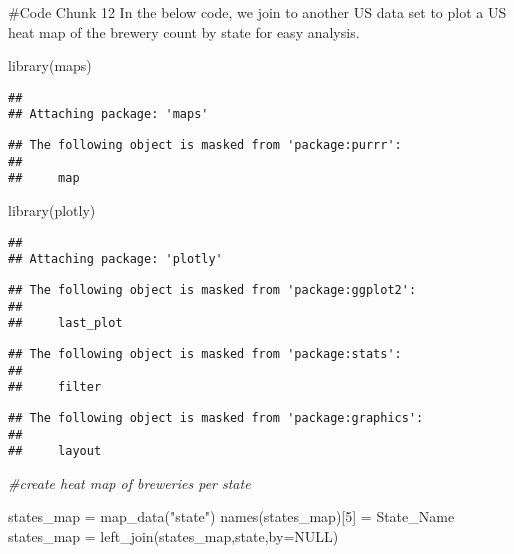 \documentclass[
]{article}
\newenvironment{Shaded}{\begin{snugshade}}{\end{snugshade}}
\newcommand{\AttributeTok}[1]{\textcolor[rgb]{0.77,0.63,0.00}{#1}}
\newcommand{\CommentTok}[1]{\textcolor[rgb]{0.56,0.35,0.01}{\textit{#1}}}
\newcommand{\ConstantTok}[1]{\textcolor[rgb]{0.00,0.00,0.00}{#1}}
\newcommand{\DecValTok}[1]{\textcolor[rgb]{0.00,0.00,0.81}{#1}}
\newcommand{\FunctionTok}[1]{\textcolor[rgb]{0.00,0.00,0.00}{#1}}
\newcommand{\NormalTok}[1]{#1}
\newcommand{\OtherTok}[1]{\textcolor[rgb]{0.56,0.35,0.01}{#1}}
\newcommand{\StringTok}[1]{\textcolor[rgb]{0.31,0.60,0.02}{#1}}
\begin{document}
\#Code Chunk 12 In the below code, we join to another US data set to
plot a US heat map of the brewery count by state for easy analysis.

\begin{Shaded}
\begin{Highlighting}[]
\FunctionTok{library}\NormalTok{(maps)}
\end{Highlighting}
\end{Shaded}

\begin{verbatim}
## 
## Attaching package: 'maps'
\end{verbatim}

\begin{verbatim}
## The following object is masked from 'package:purrr':
## 
##     map
\end{verbatim}

\begin{Shaded}
\begin{Highlighting}[]
\FunctionTok{library}\NormalTok{(plotly)}
\end{Highlighting}
\end{Shaded}

\begin{verbatim}
## 
## Attaching package: 'plotly'
\end{verbatim}

\begin{verbatim}
## The following object is masked from 'package:ggplot2':
## 
##     last_plot
\end{verbatim}

\begin{verbatim}
## The following object is masked from 'package:stats':
## 
##     filter
\end{verbatim}

\begin{verbatim}
## The following object is masked from 'package:graphics':
## 
##     layout
\end{verbatim}

\begin{Shaded}
\begin{Highlighting}[]
\CommentTok{\#create heat map of breweries per state}

\NormalTok{states\_map }\OtherTok{=} \FunctionTok{map\_data}\NormalTok{(}\StringTok{"state"}\NormalTok{)}
\FunctionTok{names}\NormalTok{(states\_map)[}\DecValTok{5}\NormalTok{] }\OtherTok{=} \StringTok{\textquotesingle{}State\_Name\textquotesingle{}}
\NormalTok{states\_map }\OtherTok{=} \FunctionTok{left\_join}\NormalTok{(states\_map,state,}\AttributeTok{by=}\ConstantTok{NULL}\NormalTok{)}
\end{Highlighting}
\end{Shaded}
\end{document}

